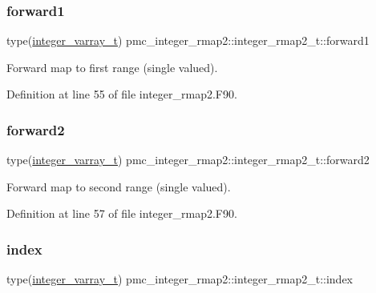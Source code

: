 \subsubsection{\texorpdfstring{forward1}{forward1}}
{\footnotesize\ttfamily type(\mbox{\hyperlink{structpmc__integer__varray_1_1integer__varray__t}{integer\+\_\+varray\+\_\+t}}) pmc\+\_\+integer\+\_\+rmap2\+::integer\+\_\+rmap2\+\_\+t\+::forward1}



Forward map to first range (single valued). 



Definition at line 55 of file integer\+\_\+rmap2.\+F90.

\mbox{\label{structpmc__integer__rmap2_1_1integer__rmap2__t_ab86feff304de6f8984330975d869df4f}} 
\subsubsection{\texorpdfstring{forward2}{forward2}}
{\footnotesize\ttfamily type(\mbox{\hyperlink{structpmc__integer__varray_1_1integer__varray__t}{integer\+\_\+varray\+\_\+t}}) pmc\+\_\+integer\+\_\+rmap2\+::integer\+\_\+rmap2\+\_\+t\+::forward2}



Forward map to second range (single valued). 



Definition at line 57 of file integer\+\_\+rmap2.\+F90.

\mbox{\label{structpmc__integer__rmap2_1_1integer__rmap2__t_a9d5bd604d5740f0ce3fade5bccba2f8c}} 
\subsubsection{\texorpdfstring{index}{index}}
{\footnotesize\ttfamily type(\mbox{\hyperlink{structpmc__integer__varray_1_1integer__varray__t}{integer\+\_\+varray\+\_\+t}}) pmc\+\_\+integer\+\_\+rmap2\+::integer\+\_\+rmap2\+\_\+t\+::index}



